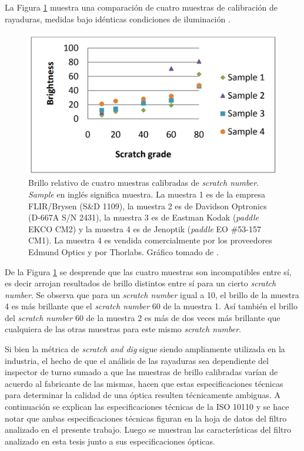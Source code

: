La Figura \ref{fig:samplescratchs} muestra una comparación de cuatro muestras de calibración de rayaduras, medidas bajo idénticas condiciones de iluminación \cite{Aikens}.
\begin{figure}[H]
	\centering
	\includegraphics[scale=0.75]{Figs/cuantificaciondefectos/samplesscratch.png}
	\caption{Brillo relativo de cuatro muestras calibradas de \textit{scratch number}. \textit{Sample} en inglés significa muestra. La muestra 1 es de la empresa FLIR/Brysen (S\&D 1109), la muestra 2 es de Davidson Optronics (D-667A S/N 2431), la muestra 3 es de Eastman Kodak (\textit{paddle} EKCO CM2) y la muestra 4 es de Jenoptik (\textit{paddle} EO \#53-157 CM1). La muestra 4 es vendida comercialmente por los proveedores Edmund Optics y por Thorlabs. Gráfico tomado de \cite{Aikens}.}
	\label{fig:samplescratchs}
\end{figure}


De la Figura \ref{fig:samplescratchs} se desprende que las cuatro muestras son incompatibles entre sí, es decir arrojan resultados de brillo distintos entre sí para un cierto \textit{scratch number}. Se observa que para un \textit{scratch number} igual a 10, el brillo de la muestra 4 es más brillante que el \textit{scratch number} 60 de la muestra 1.
Así también el brillo del \textit{scratch number} 60 de la muestra 2 es más de dos veces más brillante que cualquiera de las otras muestras para este mismo \textit{scratch number}. 

Si bien la métrica de \textit{scratch and dig} sigue siendo ampliamente utilizada en la industria, el hecho de que el análisis de las rayaduras sea dependiente del inspector de turno sumado a que las muestras de brillo calibradas varían de acuerdo al fabricante de las mismas, hacen que estas especificaciones técnicas para determinar la calidad de una óptica resulten técnicamente ambiguas. A continuación se explican las especificaciones técnicas de la ISO 10110 y se hace notar que ambas especificaciones técnicas figuran en la hoja de datos del filtro analizado en el presente trabajo. Luego se muestran las características del filtro analizado en esta tesis junto a sus especificaciones ópticas.

